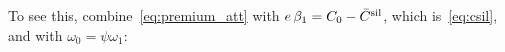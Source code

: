 To see this, combine~\eqref{eq:premium_att} with $e\,\beta_1=C_0-\bar C^{\rm sil}$, which is~\eqref{eq:csil}, and with $\omega_0=\psi\omega_1$:
